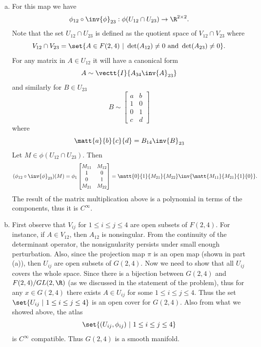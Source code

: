\begin{solution}
\begin{enumerate}[(a)]
		\item For this map we have
		\[ \phi_{12}\circ\inv{\phi}_{23}: \phi(U_{12} \cap U_{23}) \to \R^{2\times 2}. \]
		Note that the set $ U_{12}\cap U_{23} $ is defined as the quotient space of $ V_{12}\cap V_{23} $ where
		\[  V_{12}\cap V_{23} = \set{A \in F(2,4)\ |\ \det(A_{12}) \neq 0 \ \text{and}\ \det(A_{23}) \neq 0}. \]
		For any matrix in $ A \in U_{12} $ it will have a canonical form
		\[ A \sim \vectt{I}{A_{34}\inv{A}_{23}} \]
		and similarly for $ B \in U_{23} $
		\[ B \sim \begin{bmatrix}
			a & b \\
			1 & 0 \\
			0 & 1 \\
			c & d
		\end{bmatrix} \]
		where
		\[ \matt{a}{b}{c}{d} = B_{14}\inv{B}_{23} \]
		Let $ M \in \phi(U_{12}\cap U_{23}) $. Then 
		\[ (\phi_{12}\circ\inv{\phi}_{23})(M) =  
		\phi_1\begin{bmatrix}
			M_{11} & M_{12} \\
			1 & 0 \\
			0 & 1 \\
			M_{21} & M_{22}
		\end{bmatrix}
		= 
		\matt{0}{1}{M_{21}}{M_{22}} \inv{\matt{M_{11}}{M_{21}}{1}{0}}.
		\]
		The result of the matrix multiplication above is a polynomial in terms of the components, thus it is $ C^\infty $.
		
		\item First observe that $ V_{ij} $ for $ 1\leq i\leq j\leq 4 $ are open subsets of $ F(2,4) $. For instance, if $ A \in V_{12} $, then $ A_{12} $ is nonsingular. From the continuity of the determinant operator, the nonsignularity persists under small enough perturbation. Also, since the projection map $ \pi $ is an open map (shown in part (a)), then $ U_{ij} $ are open subsets of $ G(2,4) $. Now we need to show that all $ U_{ij} $ covers the whole space. Since there is a bijection between $ G(2,4) $ and $ F(2,4)/GL(2,\R) $ (as we discussed in the statement of the problem), thus for any $ x \in G(2,4) $ there exists $ A \in U_{ij} $ for some $ 1 \leq i \leq  j \leq 4$. Thus the set $ \set{U_{ij}\ |\ 1\leq i \leq j \leq 4} $ is an open cover for $ G(2,4) $. Also from what we showed above, the atlas
		\[ \set{(U_{ij},\phi_{ij})\ |\ 1 \leq i\leq j\leq 4} \]
		is $ C^\infty $ compatible. Thus $ G(2,4) $ is a smooth manifold.
	\end{enumerate}
	
\end{solution}

\newpage
